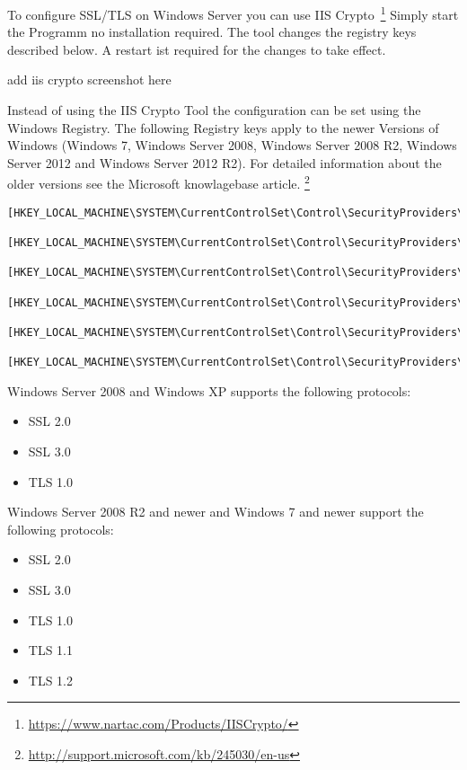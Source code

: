 To configure SSL/TLS on Windows Server you can use IIS Crypto~\footnote{\url{https://www.nartac.com/Products/IISCrypto/}}
Simply start the Programm no installation required. The tool changes the registry keys described below.
A restart ist required for the changes to take effect.

\todo add iis crypto screenshot here

Instead of using the IIS Crypto Tool the configuration can be set
using the Windows Registry. The following Registry keys apply to the
newer Versions of Windows (Windows 7, Windows Server 2008, Windows
Server 2008 R2, Windows Server 2012 and Windows Server 2012 R2). For detailed
information about the older versions see the Microsoft knowlagebase
article. \footnote{\url{http://support.microsoft.com/kb/245030/en-us}}
\begin{lstlisting}[breaklines]
  [HKEY_LOCAL_MACHINE\SYSTEM\CurrentControlSet\Control\SecurityProviders\Schannel] 
  [HKEY_LOCAL_MACHINE\SYSTEM\CurrentControlSet\Control\SecurityProviders\Schannel\Ciphers] 
  [HKEY_LOCAL_MACHINE\SYSTEM\CurrentControlSet\Control\SecurityProviders\Schannel\CipherSuites] 
  [HKEY_LOCAL_MACHINE\SYSTEM\CurrentControlSet\Control\SecurityProviders\Schannel\Hashes] 
  [HKEY_LOCAL_MACHINE\SYSTEM\CurrentControlSet\Control\SecurityProviders\Schannel\KeyExchangeAlgorithms] 
  [HKEY_LOCAL_MACHINE\SYSTEM\CurrentControlSet\Control\SecurityProviders\Schannel\Protocols] 
\end{lstlisting}

Windows Server 2008 and Windows XP supports the following protocols:
\begin{itemize}
\item SSL 2.0
\item SSL 3.0
\item TLS 1.0
\end{itemize}

Windows Server 2008 R2 and newer and Windows 7 and newer support the following protocols:
\begin{itemize}
\item SSL 2.0
\item SSL 3.0
\item TLS 1.0
\item TLS 1.1
\item TLS 1.2
\end{itemize}

